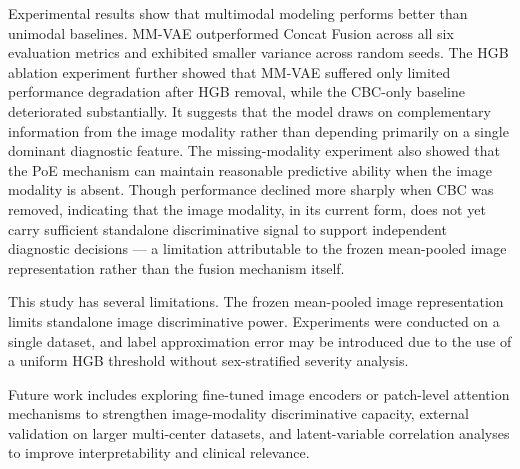\documentclass[conference]{IEEEtran}
\begin{document}
Experimental results show that multimodal modeling performs better than unimodal baselines. MM-VAE outperformed Concat Fusion across all six evaluation metrics and exhibited smaller variance across random seeds. The HGB ablation experiment further showed that MM-VAE suffered only limited performance degradation after HGB removal, while the CBC-only baseline deteriorated substantially. It suggests that the model draws on complementary information from the image modality rather than depending primarily on a single dominant diagnostic feature. The missing-modality experiment also showed that the PoE mechanism can maintain reasonable predictive ability when the image modality is absent. Though performance declined more sharply when CBC was removed, indicating that the image modality, in its current form, does not yet carry sufficient standalone discriminative signal to support independent diagnostic decisions --- a limitation attributable to the frozen mean-pooled image representation rather than the fusion mechanism itself.

This study has several limitations. The frozen mean-pooled image representation limits standalone image discriminative power. Experiments were conducted on a single dataset, and label approximation error may be introduced due to the use of a uniform HGB threshold without sex-stratified severity analysis.

Future work includes exploring fine-tuned image encoders or patch-level attention mechanisms to strengthen image-modality discriminative capacity, external validation on larger multi-center datasets, and latent-variable correlation analyses to improve interpretability and clinical relevance.
\end{document}
